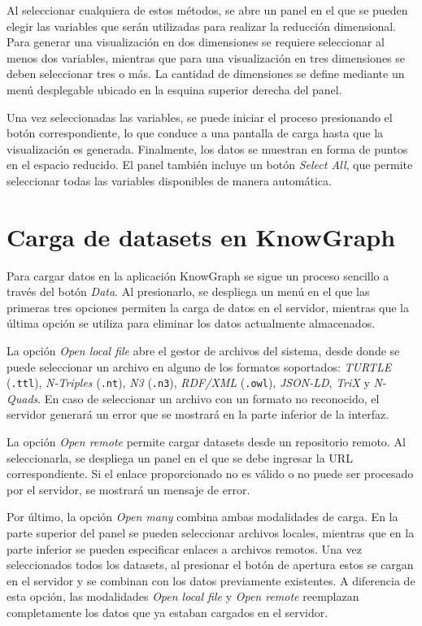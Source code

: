 \documentclass{article}
\begin{document}
Al seleccionar cualquiera de estos métodos, se abre un panel en el que se pueden elegir las variables que serán utilizadas para realizar la reducción dimensional. Para generar una visualización en dos dimensiones se requiere seleccionar al menos dos variables, mientras que para una visualización en tres dimensiones se deben seleccionar tres o más. La cantidad de dimensiones se define mediante un menú desplegable ubicado en la esquina superior derecha del panel.

Una vez seleccionadas las variables, se puede iniciar el proceso presionando el botón correspondiente, lo que conduce a una pantalla de carga hasta que la visualización es generada. Finalmente, los datos se muestran en forma de puntos en el espacio reducido. El panel también incluye un botón \textit{Select All}, que permite seleccionar todas las variables disponibles de manera automática.

\section{Carga de datasets en KnowGraph}
Para cargar datos en la aplicación KnowGraph se sigue un proceso sencillo a través del botón \textit{Data}. Al presionarlo, se despliega un menú en el que las primeras tres opciones permiten la carga de datos en el servidor, mientras que la última opción se utiliza para eliminar los datos actualmente almacenados.

La opción \textit{Open local file} abre el gestor de archivos del sistema, desde donde se puede seleccionar un archivo en alguno de los formatos soportados: \textit{TURTLE} (\texttt{.ttl}), \textit{N-Triples} (\texttt{.nt}), \textit{N3} (\texttt{.n3}), \textit{RDF/XML} (\texttt{.owl}), \textit{JSON-LD}, \textit{TriX} y \textit{N-Quads}. En caso de seleccionar un archivo con un formato no reconocido, el servidor generará un error que se mostrará en la parte inferior de la interfaz.

La opción \textit{Open remote} permite cargar datasets desde un repositorio remoto. Al seleccionarla, se despliega un panel en el que se debe ingresar la URL correspondiente. Si el enlace proporcionado no es válido o no puede ser procesado por el servidor, se mostrará un mensaje de error.

Por último, la opción \textit{Open many} combina ambas modalidades de carga. En la parte superior del panel se pueden seleccionar archivos locales, mientras que en la parte inferior se pueden especificar enlaces a archivos remotos. Una vez seleccionados todos los datasets, al presionar el botón de apertura estos se cargan en el servidor y se combinan con los datos previamente existentes. A diferencia de esta opción, las modalidades \textit{Open local file} y \textit{Open remote} reemplazan completamente los datos que ya estaban cargados en el servidor.
\end{document}
